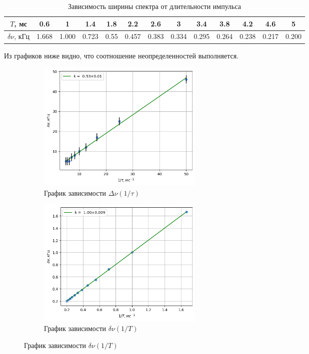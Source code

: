 \begin{table}[h!]
    \centering
    \begin{tabular}{|c|c|c|c|c|c|c|c|c|c|c|c|c|}
        \hline
        $T$, мс & 0.6& 1& 1.4& 1.8& 2.2& 2.6& 3& 3.4& 3.8& 4.2& 4.6& 5 \\\hline
        $\delta\nu$, кГц &1.668& 1.000& 0.723& 0.55& 0.457& 0.383& 0.334& 0.295& 0.264& 0.238& 0.217& 0.200\\\hline
    \end{tabular}
    \caption{Зависимость ширины спектра от длительности импульса}
\end{table}
\indent Из графиков ниже видно, что соотношение неопределенностей выполняется.
\newpage
\begin{figure}[h!]
    \centering
    \begin{subfigure}[b]{0.48\linewidth}
        \includegraphics[width=8cm]{plot1.png}
        \caption{График зависимости $\Delta\nu(1 / \tau)$}
    \end{subfigure}
    \hfill
    \begin{subfigure}[b]{0.48\linewidth}
        \includegraphics[width=8cm]{plot2.png}
        \caption{График зависимости $\delta\nu(1 /T)$}
    \end{subfigure}
\end{figure}


